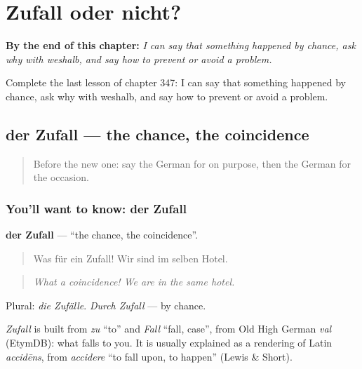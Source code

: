 
\chapter{Zufall oder nicht?}
\label{ch:ge-zufall-oder-nicht}

\begin{chapteropening}
\textbf{By the end of this chapter:} \emph{I can say that something happened by chance, ask why with weshalb, and say how to prevent or avoid a problem.}

Complete the last lesson of chapter 347: I can say that something happened by chance, ask why with weshalb, and say how to prevent or avoid a problem.
\end{chapteropening}

\section[der Zufall]{der Zufall — the chance, the coincidence}

\label{lesson:GE-C347-zufall}



\begin{quote}
Before the new one: say the German for on purpose, then the German for the occasion.
\end{quote}

\subsection*{You'll want to know: der Zufall}
\textbf{der Zufall} — \textquotedblleft{}the chance, the coincidence\textquotedblright{}.

\begin{quote}
Was für ein Zufall! Wir sind im selben Hotel.
\end{quote}

\begin{quote}
\emph{What a coincidence! We are in the same hotel.}
\end{quote}

Plural: \emph{die Zufälle}. \emph{Durch Zufall} — by chance.

\begin{cousinweb}
\emph{Zufall} is built from \emph{zu} \textquotedblleft{}to\textquotedblright{} and \emph{Fall} \textquotedblleft{}fall, case\textquotedblright{}, from Old High German \emph{val} (EtymDB): what falls to you. It is usually explained as a rendering of Latin \emph{accidēns}, from \emph{accidere} \textquotedblleft{}to fall upon, to happen\textquotedblright{} (Lewis \& Short).
\end{cousinweb}

